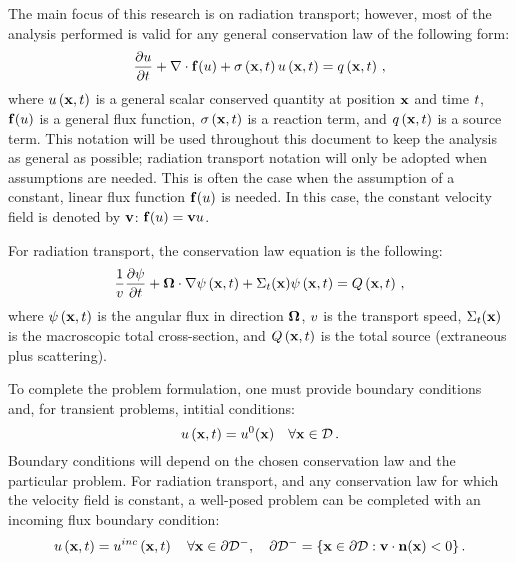 The main focus of this research is on radiation transport;
however, most of the analysis performed is valid
for any general conservation law of the following form:
\begin{equation}\label{eq:cons_law}
   \frac{\partial u}{\partial t} + \nabla\cdot\mathbf{f}(u)
   + \sigma\left(\mathbf{x},t\right) u\left(\mathbf{x},t\right) = q\left(\mathbf{x},t\right) \,,
\end{equation}
where $u\left(\mathbf{x},t\right)$ is a general scalar conserved quantity at position
$\mathbf{x}$ and time $t$, $\mathbf{f}(u)$ is a general flux
function,
$\sigma\left(\mathbf{x},t\right)$ is a reaction term, and $q\left(\mathbf{x},t\right)$ is a source
term. This notation will be used throughout this document to keep
the analysis as general as possible; radiation transport notation
will only be adopted when assumptions are needed. This is often the case when
the assumption of a constant, linear flux function $\mathbf{f}(u)$ is needed.
In this case, the constant velocity field is denoted by $\mathbf{v}$:
$\mathbf{f}(u)=\mathbf{v}u$.

For radiation transport, the conservation law equation is the following:
\begin{equation}\label{eq:rad_transport}
  \frac{1}{v}\frac{\partial \psi}{\partial t} + \mathbf{\Omega}\cdot\nabla\psi\left(\mathbf{x},t\right)
  + \Sigma_t(\mathbf{x})\psi\left(\mathbf{x},t\right) = Q\left(\mathbf{x},t\right) \,,
\end{equation}
where $\psi\left(\mathbf{x},t\right)$ is the angular flux in direction $\mathbf{\Omega}$,
$v$ is the transport speed, $\Sigma_t(\mathbf{x})$
is the macroscopic total cross-section, and $Q\left(\mathbf{x},t\right)$ is the
total source (extraneous plus scattering).

To complete the problem formulation, one must provide boundary
conditions and, for transient problems, intitial conditions:
\begin{equation}
   u\left(\mathbf{x},t\right) = u^0(\mathbf{x})
   \quad \forall \mathbf{x}\in\mathcal{D} \,.
\end{equation}
Boundary conditions will depend on the chosen conservation law and
the particular problem. 
For radiation transport, and any conservation law for which the velocity field
is constant, a well-posed problem can be completed with an incoming flux
boundary condition:
\begin{equation}
   u\left(\mathbf{x},t\right) = u^{inc}\left(\mathbf{x},t\right) \quad \forall \mathbf{x}
   \in \partial\mathcal{D}^-,
     \quad \partial\mathcal{D}^- = \{\mathbf{x}\in\partial\mathcal{D}:
     \mathbf{v}\cdot\mathbf{n}(\mathbf{x})<0\} \,.
\end{equation}
